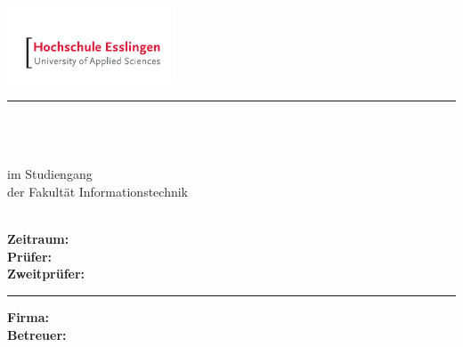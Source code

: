 \newcommand{\HRule}[2]{\noindent\rule[#1]{\linewidth}{#2}} %
\newcommand{\vlinespace}[1]{\vspace*{#1\baselineskip}} %
\newcommand{\titleemph}[1]{\textbf{#1}} %

\begin{titlepage}
\sffamily %
  \hfill \includegraphics[width=5cm]{assets/logos/hs-esslingen}
  \rule{\textwidth}{2pt}
\centering
  \Large
  \vlinespace{3}\\
  \workType\\
  \huge
  \workTitel\\

  \Large
  \vlinespace{2}
      im Studiengang \workStudiengang\\
      der Fakultät Informationstechnik\\

  \workSemester\\

  \vlinespace{2}
  \workNameStudent

\vfill
\raggedright

\large
\titleemph{Zeitraum:} \workTimeframe \\ %
\titleemph{Prüfer:} \workPruefer \\
\titleemph{Zweitprüfer:} \workZweitPruefer \\ %

\vlinespace{1}
\rule{\textwidth}{2pt}
\begin{multicols}{2}
  \titleemph{Firma:} \workComany \\
  \titleemph{Betreuer:} \workBetreuer
\columnbreak
  \begin{flushright}
    \workComanyLogo
  \end{flushright}
\end{multicols}
%
\end{titlepage}
